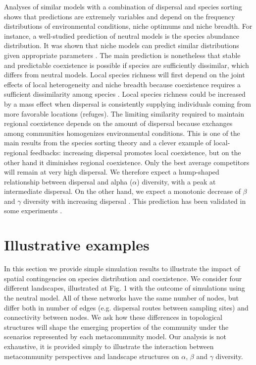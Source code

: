 \documentclass[12pt]{article}
\begin{document}
Analyses of similar models with a combination of dispersal and species sorting
shows that predictions are extremely variables and depend on the frequency
distributions of environmental conditions, niche optimums and niche breadth. For
instance, a well-studied prediction of neutral models is the species abundance
distribution. It was shown that niche models can predict similar distributions
given appropriate parameters \parencite{Tilman2004,Gravel2006}. The main
prediction is nonetheless that stable and predictable coexistence is possible if
species are sufficiently dissimilar, which differs from neutral models. Local
species richness will first depend on the joint effects of local heterogeneity
and niche breadth because coexistence requires a sufficient dissimilarity among
species \parencite{Schwilk2005}. Local species richness could be increased by a
mass effect when dispersal is consistently supplying individuals coming from
more favorable locations (refuges). The limiting similarity required to maintain
regional coexistence depends on the amount of dispersal because exchanges among
communities homogenizes environmental conditions. This is one of the main results
from the species sorting theory and a clever example of local-regional
feedbacks: increasing dispersal promotes local coexistence, but on the other
hand it diminishes regional coexistence. Only the best average competitors will
remain at very high dispersal. We therefore expect
a hump-shaped relationship between dispersal and alpha ($\alpha$) diversity,
with a peak at intermediate dispersal. On the other hand, we expect a monotonic
decrease of $\beta$ and $\gamma$ diversity with increasing dispersal
\parencite{Mouquet2003}. This prediction has been validated in some experiments
\parencite{Venail2008, Logue2011}.

\section*{Illustrative examples}

In this section we provide simple simulation results to illustrate the impact of
spatial contingencies on species distribution and coexistence. We consider four
different landscapes, illustrated at Fig. 1 with the outcome of simulations
using the neutral model. All of these networks have the same number of nodes,
but differ both in number of edges (e.g. dispersal routes between sampling
sites) and connectivity between nodes. We ask how these differences
in topological structures will shape the emerging properties of the community under the
scenarios represented by each metacommunity model. Our analysis is not
exhaustive, it is provided simply to illustrate the interaction between
metacommunity perspectives and landscape structures on $\alpha$, $\beta$ and
$\gamma$ diversity.
\end{document}
